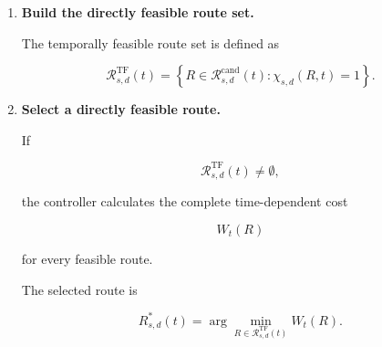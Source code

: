 \begin{enumerate}
For every candidate route $R$, calculate

\begin{equation}
    \chi_{\mathrm{avail}}(R,t),
    \quad
    \chi_{\mathrm{linkF}}(R,t),
    \quad
    \chi_{\mathrm{coh}}(R,t),
\end{equation}

and

\begin{equation}
    \chi_{\mathrm{endF}}(R,t),
    \quad
    \chi_{\mathrm{delay}}(R,t),
    \quad
    \chi_{\mathrm{mem}}(R,t).
\end{equation}

    The overall feasibility indicator is

\begin{equation}
\begin{aligned}
  \chi_{s,d}(R,t)
  ={}&
  \chi_{\mathrm{avail}}(R,t)
  \chi_{\mathrm{linkF}}(R,t)
  \chi_{\mathrm{coh}}(R,t)
  \\
  &{}\times
  \chi_{\mathrm{endF}}(R,t)
  \chi_{\mathrm{delay}}(R,t)
  \chi_{\mathrm{mem}}(R,t).
\end{aligned}
\end{equation}


\item \textbf{Build the directly feasible route set.}

The temporally feasible route set is defined as

\begin{equation}
    \mathcal{R}_{s,d}^{\mathrm{TF}}(t)
    =
    \left\{
    R
    \in
    \mathcal{R}_{s,d}^{\mathrm{cand}}(t)
    :
    \chi_{s,d}(R,t)=1
    \right\}.
\end{equation}


\item \textbf{Select a directly feasible route.}

If

\begin{equation}
    \mathcal{R}_{s,d}^{\mathrm{TF}}(t)
    \neq
    \emptyset,
\end{equation}

the controller calculates the complete time-dependent cost

\begin{equation}
    W_t(R)
\end{equation}

for every feasible route.

The selected route is

\begin{equation}
    R_{s,d}^{*}(t)
    =
    \arg\min_{
    R
    \in
    \mathcal{R}_{s,d}^{\mathrm{TF}}(t)
    }
    W_t(R).
\end{equation}


\end{enumerate}

